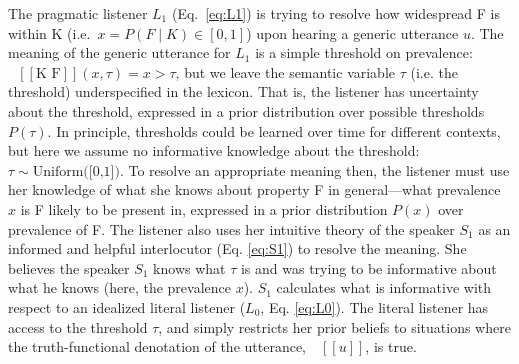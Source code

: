 \documentclass[12pt,letterpaper]{article}
\newcommand{\denote}[1]{\mbox{ $[\![ #1 ]\!]$}}
\begin{document}

The pragmatic listener $L_1$ (Eq.~\ref{eq:L1}) is trying to resolve how widespread F is within K (i.e.~$x = P(F\mid K) \in [0, 1]$) upon hearing a generic utterance $u$. 
The meaning of the generic utterance for $L_1$ is a simple threshold on prevalence: $\denote{\text{K F}}(x, \tau)=x>\tau$, but we leave the semantic variable $\tau$ (i.e. the threshold) underspecified in the lexicon. 
That is, the listener has uncertainty about the threshold, expressed in a prior distribution over possible thresholds $P(\tau)$.
In principle, thresholds could be learned over time for different contexts, but here we assume no informative knowledge about the threshold: $\tau \sim \text{Uniform([0,1])}$.
To resolve an appropriate meaning then, the listener must use her knowledge of what she knows about property F in general---what prevalence $x$ is F likely to be present in, expressed in a prior distribution $P(x)$ over prevalence of F. 
The listener also uses her intuitive theory of the speaker $S_{1}$ as an informed and helpful interlocutor (Eq. \ref{eq:S1}) to resolve the meaning.
She believes the speaker $S_1$ knows what $\tau$ is and was trying to be informative about what he knows (here, the prevalence $x$).
$S_1$ calculates what is informative with respect to an idealized literal listener ($L_{0}$, Eq. \ref{eq:L0}).
The literal listener has access to the threshold $\tau$, and simply restricts her prior beliefs to situations where the truth-functional denotation of the utterance, $\denote{u}$, is true.
\end{document}
